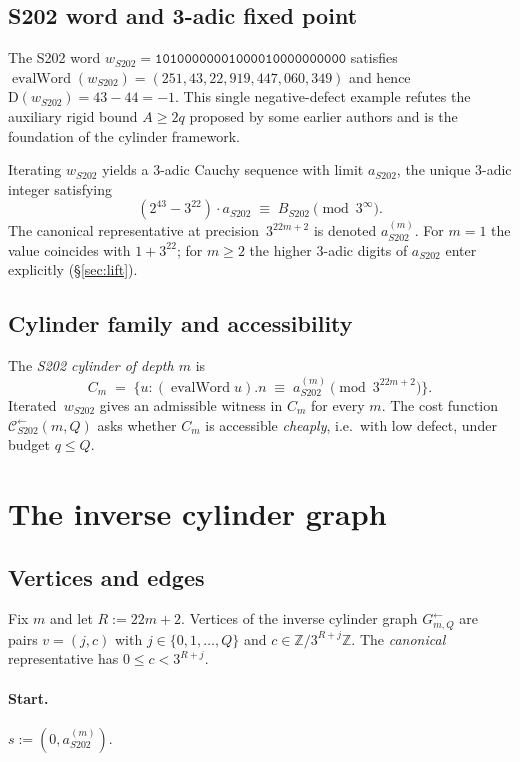 \documentclass[11pt,a4paper]{article}
\theoremstyle{plain}
\theoremstyle{definition}
\newcommand{\ZZ}{\mathbb{Z}}
\newcommand{\aS}{a_{S202}}
\newcommand{\aSat}{a_{S202}^{(m)}}
\newcommand{\wS}{w_{S202}}
\newcommand{\defect}{\mathrm{D}}
\newcommand{\Cback}{\mathcal{C}^{\!\leftarrow}_{S202}}
\newcommand{\InvG}{G^{\!\leftarrow}}
\DeclareMathOperator{\evalWord}{evalWord}
\begin{document}
\subsection{S202 word and 3-adic fixed point}

The S202 word
$\wS = \mathtt{10100000001000010000000000}$
satisfies $\evalWord(\wS) = (251, 43, 22, 919{,}447{,}060{,}349)$
and hence $\defect(\wS) = 43 - 44 = -1$. This single negative-defect
example refutes the auxiliary rigid bound $A \ge 2q$ proposed by
some earlier authors and is the foundation of the cylinder framework.

Iterating $\wS$ yields a 3-adic Cauchy sequence with limit $\aS$, the
unique 3-adic integer satisfying
\[
  (2^{43} - 3^{22}) \cdot \aS \;\equiv\; B_{S202}
  \pmod{3^{\infty}}.
\]
The canonical representative at precision~$3^{22m+2}$ is denoted
$\aSat$. For $m = 1$ the value coincides with $1 + 3^{22}$; for
$m \ge 2$ the higher 3-adic digits of $\aS$ enter explicitly
(\S\ref{sec:lift}).

\subsection{Cylinder family and accessibility}

The \emph{S202 cylinder of depth $m$} is
\[
  C_m \;=\;
  \bigl\{ u : (\evalWord u).n
              \;\equiv\; \aSat
              \pmod{3^{22m+2}} \bigr\}.
\]
Iterated~$\wS$ gives an admissible witness in $C_m$ for every $m$.
The cost function $\Cback(m, Q)$ asks whether $C_m$ is accessible
\emph{cheaply}, i.e.\ with low defect, under budget $q \le Q$.

\section{The inverse cylinder graph}\label{sec:s202-cylinders}

\subsection{Vertices and edges}

Fix $m$ and let $R := 22m + 2$. Vertices of the inverse cylinder
graph $\InvG_{m, Q}$ are pairs
$v = (j, c)$ with $j \in \{0, 1, \dots, Q\}$ and $c \in \ZZ/3^{R+j}\ZZ$.
The \emph{canonical} representative has $0 \le c < 3^{R+j}$.

\paragraph{Start.} $s := (0, \aSat)$.
\end{document}
